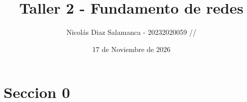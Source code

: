 \documentclass[12pt,letterpaper]{article}
\title{Taller 2 - Fundamento de redes}
\author{Nicolás Diaz Salamanca - 20232020059 // }
\date{17 de Noviembre de 2026}
\begin{document}
\maketitle


\thispagestyle{empty}
\newpage

\tableofcontents
\newpage

\section{Seccion 0}
\end{document}
